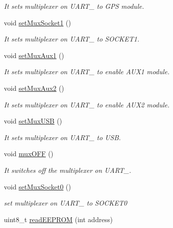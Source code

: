 \begin{DoxyCompactItemize}
\begin{DoxyCompactList}\small\item\em It sets multiplexer on U\+A\+R\+T\+\_ to G\+PS module. \end{DoxyCompactList}\item 
void \hyperlink{class_wasp_utils_a7452034cd6782c06789a0092f6c93e9d}{set\+Mux\+Socket1} ()
\begin{DoxyCompactList}\small\item\em It sets multiplexer on U\+A\+R\+T\+\_ to S\+O\+C\+K\+E\+T1. \end{DoxyCompactList}\item 
void \hyperlink{class_wasp_utils_ad7f0a2e942d87f6e567a3712c552c975}{set\+Mux\+Aux1} ()
\begin{DoxyCompactList}\small\item\em It sets multiplexer on U\+A\+R\+T\+\_ to enable A\+U\+X1 module. \end{DoxyCompactList}\item 
void \hyperlink{class_wasp_utils_a0ff4625218c7b88d5ee4014c01ac5ef9}{set\+Mux\+Aux2} ()
\begin{DoxyCompactList}\small\item\em It sets multiplexer on U\+A\+R\+T\+\_ to enable A\+U\+X2 module. \end{DoxyCompactList}\item 
void \hyperlink{class_wasp_utils_a61f1e0f50f709b5175947ff0888f59cd}{set\+Mux\+U\+SB} ()
\begin{DoxyCompactList}\small\item\em It sets multiplexer on U\+A\+R\+T\+\_ to U\+SB. \end{DoxyCompactList}\item 
void \hyperlink{class_wasp_utils_a91f9f0c9d9a765ef759a6e5eeeb46eb1}{mux\+O\+FF} ()
\begin{DoxyCompactList}\small\item\em It switches off the multiplexer on U\+A\+R\+T\+\_. \end{DoxyCompactList}\item 
void \hyperlink{class_wasp_utils_a1b3173e90f64ada4ed0bac8b3527f48d}{set\+Mux\+Socket0} ()
\begin{DoxyCompactList}\small\item\em set multiplexer on U\+A\+R\+T\+\_ to S\+O\+C\+K\+E\+T0 \end{DoxyCompactList}\item 
uint8\+\_\+t \hyperlink{class_wasp_utils_a155a788594604101c16bf3a909649f9c}{read\+E\+E\+P\+R\+OM} (int address)

\end{DoxyCompactItemize}
